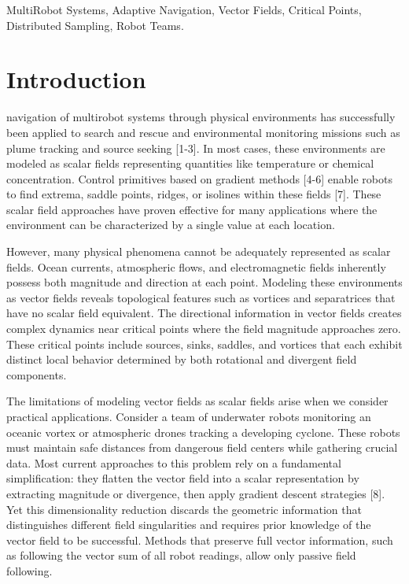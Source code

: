 \documentclass[lettersize,journal]{IEEEtran}
\begin{document}
\begin{IEEEkeywords}
MultiRobot Systems, Adaptive Navigation, Vector Fields, Critical Points, Distributed Sampling, Robot Teams.
\end{IEEEkeywords}


\section{Introduction}
 navigation of multirobot systems through physical environments has successfully been applied to search and rescue and environmental monitoring missions such as plume tracking and source seeking [1-3]. In most cases, these environments are modeled as scalar fields representing quantities like temperature or chemical concentration. Control primitives based on gradient methods [4-6] enable robots to find extrema, saddle points, ridges, or isolines within these fields [7]. These scalar field approaches have proven effective for many applications where the environment can be characterized by a single value at each location.

However, many physical phenomena cannot be adequately represented as scalar fields. Ocean currents, atmospheric flows, and electromagnetic fields inherently possess both magnitude and direction at each point. Modeling these environments as vector fields reveals topological features such as vortices and separatrices that have no scalar field equivalent. The directional information in vector fields creates complex dynamics near critical points where the field magnitude approaches zero. These critical points include sources, sinks, saddles, and vortices that each exhibit distinct local behavior determined by both rotational and divergent field components.

The limitations of modeling vector fields as scalar fields arise when we consider practical applications. Consider a team of underwater robots monitoring an oceanic vortex or atmospheric drones tracking a developing cyclone. These robots must maintain safe distances from dangerous field centers while gathering crucial data. Most current approaches to this problem rely on a fundamental simplification: they flatten the vector field into a scalar representation by extracting magnitude or divergence, then apply gradient descent strategies [8]. Yet this dimensionality reduction discards the geometric information that distinguishes different field singularities and requires prior knowledge of the vector field to be successful. Methods that preserve full vector information, such as following the vector sum of all robot readings, allow only passive field following.
\end{document}
